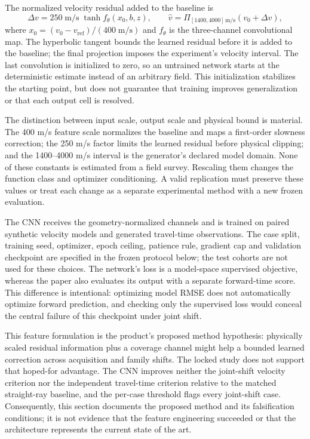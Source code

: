 \documentclass[11pt]{article}
\begin{document}
The normalized velocity residual added to the baseline is
\begin{equation}\label{eq:bounded-cnn-update}
\Delta v=250\;\mathrm{m/s}\;\tanh f_{\theta}(x_0,b,z),\qquad \hat v=\Pi_{[1400,4000]\,\mathrm{m/s}}(v_0+\Delta v),
\end{equation}
where $x_0=(v_0-v_{\mathrm{ref}})/(400\;\mathrm{m/s})$ and $f_\theta$ is the three-channel convolutional map. The hyperbolic tangent bounds the learned residual before it is added to the baseline; the final projection imposes the experiment's velocity interval. The last convolution is initialized to zero, so an untrained network starts at the deterministic estimate instead of an arbitrary field. This initialization stabilizes the starting point, but does not guarantee that training improves generalization or that each output cell is resolved.

The distinction between input scale, output scale and physical bound is material. The 400 m/s feature scale normalizes the baseline and maps a first-order slowness correction; the 250 m/s factor limits the learned residual before physical clipping; and the 1400--4000 m/s interval is the generator's declared model domain. None of these constants is estimated from a field survey. Rescaling them changes the function class and optimizer conditioning. A valid replication must preserve these values or treat each change as a separate experimental method with a new frozen evaluation.

The CNN receives the geometry-normalized channels and is trained on paired synthetic velocity models and generated travel-time observations. The case split, training seed, optimizer, epoch ceiling, patience rule, gradient cap and validation checkpoint are specified in the frozen protocol below; the test cohorts are not used for these choices. The network's loss is a model-space supervised objective, whereas the paper also evaluates its output with a separate forward-time score. This difference is intentional: optimizing model RMSE does not automatically optimize forward prediction, and checking only the supervised loss would conceal the central failure of this checkpoint under joint shift.

This feature formulation is the product's proposed method hypothesis: physically scaled residual information plus a coverage channel might help a bounded learned correction across acquisition and family shifts. The locked study does not support that hoped-for advantage. The CNN improves neither the joint-shift velocity criterion nor the independent travel-time criterion relative to the matched straight-ray baseline, and the per-case threshold flags every joint-shift case. Consequently, this section documents the proposed method and its falsification conditions; it is not evidence that the feature engineering succeeded or that the architecture represents the current state of the art.
\end{document}
